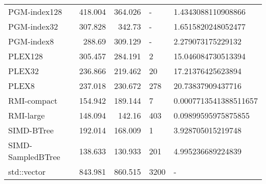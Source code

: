 \begin{tabular}{lrrll}
 PGM-index128      &               418.004  &              364.026  & -            & 1.4343088110908866    \\
 PGM-index32       &               307.828  &              342.73   & -            & 1.6515820248052477    \\
 PGM-index8        &               288.69   &              309.129  & -            & 2.279073175229132     \\
 PLEX128           &               305.457  &              284.191  & 2            & 15.046084730513394    \\
 PLEX32            &               236.866  &              219.462  & 20           & 17.21376425623894     \\
 PLEX8             &               237.018  &              230.672  & 278          & 20.73837909437716     \\
 RMI-compact       &               154.942  &              189.144  & 7            & 0.0007713541388511657 \\
 RMI-large         &               148.094  &              142.16   & 403          & 0.09899595975875855   \\
 SIMD-BTree        &               192.014  &              168.009  & 1            & 3.928705015219748     \\
 SIMD-SampledBTree &               138.633  &              130.933  & 201          & 4.995236689224839     \\
 std::vector       &               843.981  &              860.515  & 3200         & -                     \\
\hline
\end{tabular}